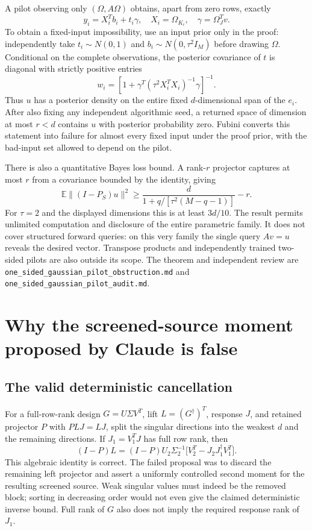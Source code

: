 \documentclass[11pt,oneside,openany,a4paper]{book}
\numberwithin{equation}{chapter}
\theoremstyle{definition}
\theoremstyle{remark}
\newcommand{\sourcefile}[1]{{\small\nolinkurl{#1}}}
\begin{document}
A pilot observing only $(\Omega,A\Omega)$ obtains, apart from zero
rows, exactly
\[
 y_i=X_i^Tb_i+t_i\gamma,
 \quad X_i=\Omega_{K_i},\quad \gamma=\Omega_J^Tv.
\]
To obtain a fixed-input impossibility, use an input prior only in the
proof: independently take $t_i\sim N(0,1)$ and
$b_i\sim N(0,\tau^2 I_M)$ before drawing $\Omega$.  Conditional on
the complete observations, the posterior covariance of $t$ is diagonal
with strictly positive entries
\[
 w_i=\left[1+\gamma^T(\tau^2X_i^TX_i)^{-1}\gamma\right]^{-1}.
\]
Thus $u$ has a posterior density on the entire fixed $d$-dimensional
span of the $e_i$.  After also fixing any independent algorithmic seed,
a returned space of dimension at most $r<d$ contains $u$ with posterior
probability zero.  Fubini converts this statement into failure for
almost every fixed input under the proof prior, with the bad-input set
allowed to depend on the pilot.

There is also a quantitative Bayes loss bound.  A rank-$r$ projector
captures at most $r$ from a covariance bounded by the identity, giving
\[
 \mathbb E\|(I-P_S)u\|^2
 \ge\frac{d}{1+q/[\tau^2(M-q-1)]}-r.
\]
For $\tau=2$ and the displayed dimensions this is at least $3d/10$.
The result permits unlimited computation and disclosure of the entire
parametric family.  It does not cover structured forward queries: on
this very family the single query $Av=u$ reveals the desired vector.
Transpose products and independently trained two-sided pilots are also
outside its scope.  The theorem and independent review are
\sourcefile{one_sided_gaussian_pilot_obstruction.md} and
\sourcefile{one_sided_gaussian_pilot_audit.md}.

\section{Why the screened-source moment proposed by Claude is false}

\subsection{The valid deterministic cancellation}

For a full-row-rank design $G=U\Sigma V^T$, lift
$L=(G^\dagger)^T$, response $J$, and retained projector $P$ with
$PLJ=LJ$, split the singular directions into the weakest $d$ and the
remaining directions.  If $J_1=V_1^TJ$ has full row rank, then
\[
 (I-P)L=(I-P)U_2\Sigma_2^{-1}
       \bigl[V_2^T-J_2J_1^\dagger V_1^T\bigr].
\]
This algebraic identity is correct.  The failed proposal was to discard
the remaining left projector and assert a uniformly controlled second
moment for the resulting screened source.  Weak singular values must
indeed be the removed block; sorting in decreasing order would not even
give the claimed deterministic inverse bound.  Full rank of $G$ also
does not imply the required response rank of $J_1$.
\end{document}
